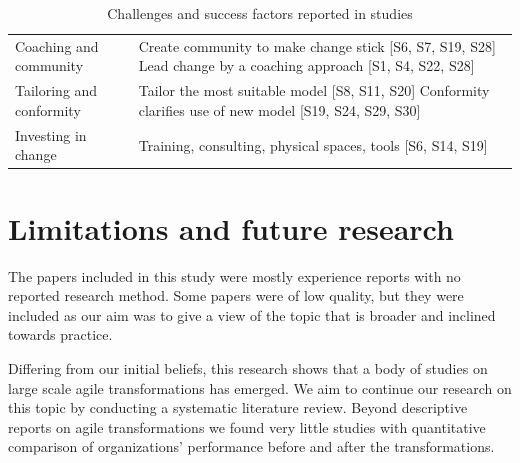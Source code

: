 \documentclass[lnbip]{svmultln}
\begin{document}
\begin{table}[t]
\begin{tabular}{ p{} p{} }
        \raggedright\rule{0pt}{0.4cm}Coaching and community  &
             Create community to make change stick [S6, S7, S19, S28] \newline
             Lead change by a coaching approach [S1, S4, S22, S28] \\
        
        \raggedright\rule{0pt}{0.4cm}Tailoring and conformity  &
            Tailor the most suitable model [S8, S11, S20] \newline
            Conformity clarifies use of new model [S19, S24, S29, S30]\\
        
        \raggedright\rule{0pt}{0.4cm}Investing in change  &
            Training, consulting, physical spaces, tools [S6, S14, S19]\\
        \bottomrule
    \end{tabular}
    \caption{Challenges and success factors reported in studies}
    \label{table:success}
\end{table}


\section{Limitations and future research}
\label{sec:conclusion}

The papers included in this study were mostly experience reports with no reported
research method. Some papers were of low quality, but they were included as our
aim was to give a view of the topic that is broader and inclined towards practice.

Differing from our initial beliefs, this research shows that a body of studies
on large scale agile transformations has emerged. We aim to continue our
research on this topic by conducting a systematic literature review. Beyond
descriptive reports on agile transformations we found very little studies with
quantitative comparison of organizations' performance before and after the
transformations.






\end{document}
